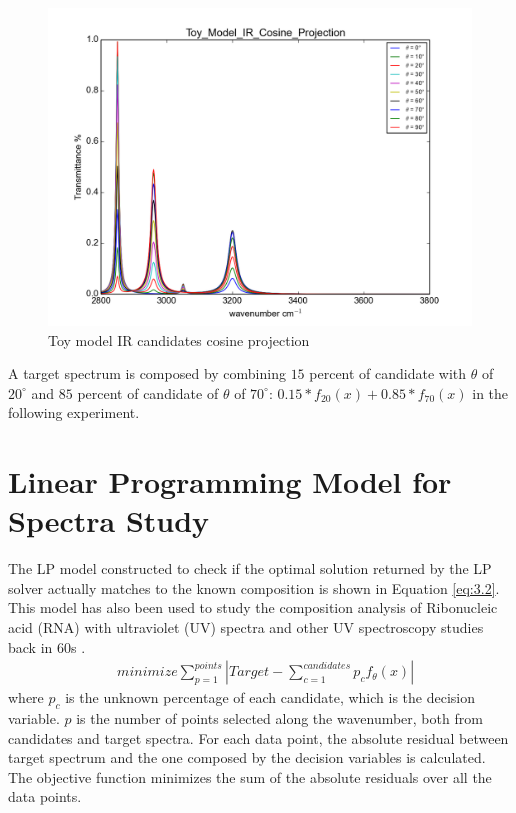 \begin{figure}[!ht] \label{fig:3.1}
\centering
\includegraphics[scale=0.4]{Figures/Toy_Model_IR_Cosine_Projection.png} 
\caption{Toy model IR candidates cosine projection} 
\end{figure}

A target spectrum is composed by combining $15$ percent of candidate with $\theta$ of $20^{\circ}$ and $85$ percent of candidate of $\theta$ of $70^{\circ}$: $0.15*f_{20}(x) + 0.85*f_{70}(x)$ in the following experiment. \\

\section{Linear Programming Model for Spectra Study}

The LP model constructed to check if the optimal solution returned by the LP solver actually matches to the known composition is shown in Equation \ref{eq:3.2}. This model has also been used to study the composition analysis of Ribonucleic acid (RNA) with ultraviolet (UV) spectra and other UV spectroscopy studies back in 60s \cite{NYAS:NYAS900} \cite{LPATUAS}. \\

\begin{eqnarray} \label{eq:3.2}
& minimize \displaystyle\sum^{points}_{p=1} \left| Target- \displaystyle\sum^{candidates}_{c=1}p_{c}f_{\theta}(x) \right| 
\end{eqnarray}
where $p_{c}$ is the unknown percentage of each candidate, which is the decision variable. $p$ is the number of points selected along the wavenumber, both from candidates and target spectra. For each data point, the absolute residual between target spectrum and the one composed by the decision variables is calculated. The objective function minimizes the sum of the absolute residuals over all the data points. \\

